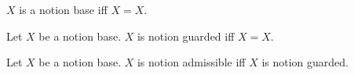 \begin{definition}\label{notion_base}
    $X$ is a notion base iff $X=X$.
\end{definition}

\begin{definition}\label{notion_guarded}
    Let $X$ be a notion base.
    $X$ is notion guarded iff $X=X$.
\end{definition}

\begin{definition}\label{notion_guarded_alias}
    Let $X$ be a notion base.
    $X$ is notion admissible iff $X$ is notion guarded.
\end{definition}
